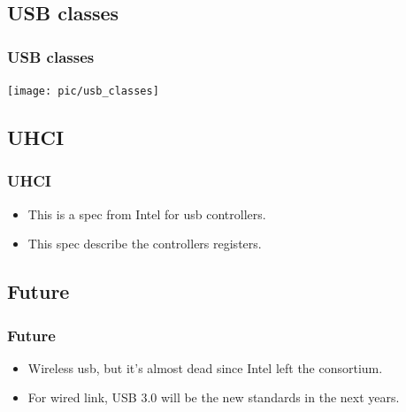 \subsection{USB classes}
\begin{frame}
\frametitle{USB classes}
\begin{center}
\texttt{[image: pic/usb\_classes]}
\end{center}
\end{frame}

\subsection{UHCI}
\begin{frame}
\frametitle{UHCI}
\begin{itemize}
\item This is a spec from Intel for usb controllers.
\item This spec describe the controllers registers.
\end{itemize}
\end{frame}

\subsection{Future}
\begin{frame}
\frametitle{Future}
\begin{itemize}
\item Wireless usb, but it's almost dead since Intel left the consortium.
\item For wired link, USB 3.0 will be the new standards in the next years.
\end{itemize}
\end{frame}





